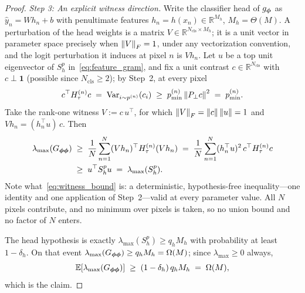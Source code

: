 \begin{proof}
\emph{Step 3: An explicit witness direction.}
Write the classifier head of $g_{\boldsymbol{\phi}}$ as $\hat{y}_n = W h_n + b$ with
penultimate features $h_n = h(x_n) \in \mathbb{R}^{M_h}$,
$M_h = \Theta(M)$. A perturbation of the head weights is a matrix
$V \in \mathbb{R}^{N_{\mathrm{cls}} \times M_h}$; it is a unit vector in
parameter space precisely when $\left\lVert V\right\rVert_F = 1$, under any vectorization
convention, and the logit perturbation it induces at pixel $n$ is $V h_n$.
Let $u$ be a top unit eigenvector of $S_h^{p}$ in~\eqref{eq:feature_gram},
and fix a unit contrast $c \in \mathbb{R}^{N_{\mathrm{cls}}}$ with
$c \perp \mathbf{1}$ (possible since $N_{\mathrm{cls}} \geq 2$); by Step~2,
at every pixel
\[
    c^\top H_\tau^{(n)} c
    \;=\; \mathrm{Var}_{i \sim p^{(n)}}(c_i)
    \;\geq\; p^{(n)}_{\min} \left\lVert P_\perp c\right\rVert^2
    \;=\; p^{(n)}_{\min}.
\]
Take the rank-one witness $V := c\, u^\top$, for which
$\left\lVert V\right\rVert_F = \left\lVert c\right\rVert\left\lVert u\right\rVert = 1$ and $V h_n = (h_n^\top u)\, c$. Then
\begin{equation}
\label{eq:witness_bound}
\begin{aligned}
    \lambda_{\max}(G_{{\boldsymbol{\phi}}{\boldsymbol{\phi}}})
    &\;\geq\; \frac{1}{N} \sum_{n=1}^{N}
        (V h_n)^\top H_\tau^{(n)} (V h_n)
    \;=\; \frac{1}{N} \sum_{n=1}^{N}
        (h_n^\top u)^2\, c^\top H_\tau^{(n)} c\\
    &\;\geq\; u^\top S_h^{p} u
    \;=\; \lambda_{\max}(S_h^{p}).
\end{aligned}
\end{equation}
Note what~\eqref{eq:witness_bound} is: a deterministic, hypothesis-free
inequality---one identity and one application of Step~2---valid at every
parameter value. All $N$ pixels contribute, and no minimum over pixels is
taken, so no union bound and no factor of $N$ enters.

The head hypothesis is exactly $\lambda_{\max}(S_h^{p}) \geq q_h M_h$ with
probability at least $1 - \delta_h$. On that event
$\lambda_{\max}(G_{{\boldsymbol{\phi}}{\boldsymbol{\phi}}}) \geq q_h M_h = \Omega(M)$; since
$\lambda_{\max} \geq 0$ always,
\[
    \mathbb{E}\!\left[\lambda_{\max}(G_{{\boldsymbol{\phi}}{\boldsymbol{\phi}}})\right]
    \;\geq\; (1 - \delta_h)\, q_h M_h
    \;=\; \Omega(M),
\]
which is the claim.


\end{proof}
